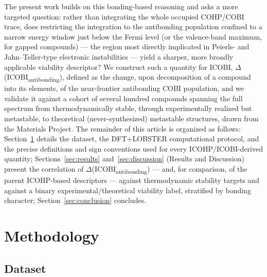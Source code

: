 \documentclass[journal=jpccck,manuscript=article]{achemso}
\begin{document}
The present work builds on this bonding-based reasoning and asks a more
targeted question: rather than integrating the whole occupied COHP/COBI
trace, does restricting the integration to the antibonding population
confined to a narrow energy window just below the Fermi level (or the
valence-band maximum, for gapped compounds) --- the region most directly
implicated in Peierls- and Jahn--Teller-type electronic
instabilities --- yield a sharper, more broadly applicable viability
descriptor? We construct such a quantity for ICOBI,
$\Delta$(ICOBI\textsubscript{antibonding}), defined as the change, upon
decomposition of a compound into its elements, of the near-frontier
antibonding COBI population, and we validate it against a cohort of several
hundred compounds spanning the full spectrum from thermodynamically stable,
through experimentally realized but metastable, to theoretical
(never-synthesized) metastable structures, drawn from the Materials
Project.\cite{jain2013} The remainder of this article is organized as
follows: Section~\ref{sec:methods} details the dataset, the DFT+LOBSTER
computational protocol, and the precise definitions and sign conventions
used for every ICOHP/ICOBI-derived quantity; Sections~\ref{sec:results}
and~\ref{sec:discussion} (Results and Discussion) present the correlation of
$\Delta$(ICOBI\textsubscript{antibonding}) --- and, for comparison, of the
parent ICOHP-based descriptors --- against thermodynamic stability targets
and against a binary experimental/theoretical viability label, stratified by
bonding character; Section~\ref{sec:conclusion} concludes.

\section{Methodology}
\label{sec:methods}

\subsection{Dataset}
\label{sec:dataset}
\end{document}

